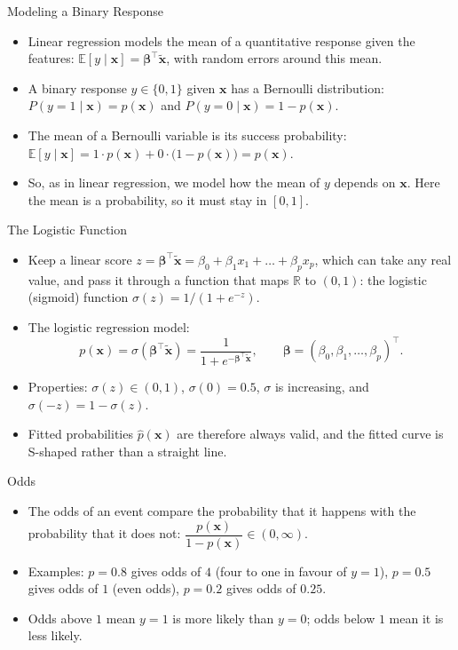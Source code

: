 \begin{frame}{Modeling a Binary Response}
    \begin{itemize}
        \item Linear regression models the mean of a quantitative response given the features: $\mathbb{E}[y \mid \mathbf{x}] = \symbf{\beta}^\top \tilde{\mathbf{x}}$, with random errors around this mean.
        \item A binary response $y \in \{0, 1\}$ given $\mathbf{x}$ has a Bernoulli distribution: $P(y = 1 \mid \mathbf{x}) = p(\mathbf{x})$ and $P(y = 0 \mid \mathbf{x}) = 1 - p(\mathbf{x})$.
        \item The mean of a Bernoulli variable is its success probability: $\mathbb{E}[y \mid \mathbf{x}] = 1 \cdot p(\mathbf{x}) + 0 \cdot \big(1 - p(\mathbf{x})\big) = p(\mathbf{x})$.
        \item So, as in linear regression, we model how the mean of $y$ depends on $\mathbf{x}$. Here the mean is a probability, so it must stay in $[0, 1]$.
    \end{itemize}
\end{frame}


\begin{frame}{The Logistic Function}
    \begin{itemize}
        \item Keep a linear score $z = \symbf{\beta}^\top \tilde{\mathbf{x}} = \beta_0 + \beta_1 x_1 + \dots + \beta_p x_p$, which can take any real value, and pass it through a function that maps $\mathbb{R}$ to $(0, 1)$: the logistic (sigmoid) function $\sigma(z) = 1 / (1 + e^{-z})$.
        \item The logistic regression model:
        \[
            p(\mathbf{x}) = \sigma(\symbf{\beta}^\top \tilde{\mathbf{x}}) = \frac{1}{1 + e^{-\symbf{\beta}^\top \tilde{\mathbf{x}}}}, \qquad \symbf{\beta} = (\beta_0, \beta_1, \dots, \beta_p)^\top.
        \]
        \item Properties: $\sigma(z) \in (0, 1)$, $\sigma(0) = 0.5$, $\sigma$ is increasing, and $\sigma(-z) = 1 - \sigma(z)$.
        \item Fitted probabilities $\hat{p}(\mathbf{x})$ are therefore always valid, and the fitted curve is S-shaped rather than a straight line.
    \end{itemize}
\end{frame}


\begin{frame}{Odds}
    \begin{itemize}
        \item The odds of an event compare the probability that it happens with the probability that it does not: $\dfrac{p(\mathbf{x})}{1 - p(\mathbf{x})} \in (0, \infty)$.
        \item Examples: $p = 0.8$ gives odds of $4$ (four to one in favour of $y = 1$), $p = 0.5$ gives odds of $1$ (even odds), $p = 0.2$ gives odds of $0.25$.
        \item Odds above $1$ mean $y = 1$ is more likely than $y = 0$; odds below $1$ mean it is less likely.
    \end{itemize}
\end{frame}


